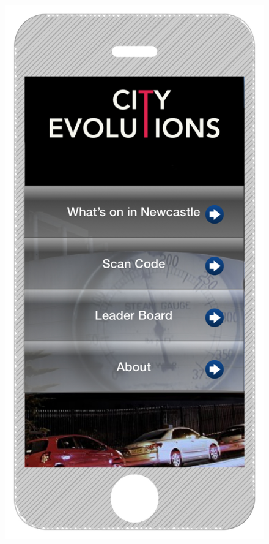 \documentclass[a4paper,12pt]{article}
\begin{document}
\begin{figure}
\centering
\begin{minipage}{.5\textwidth}
  \centering
  \includegraphics[width=.6\linewidth]{./images/iphone-interface}
  \label{iphone-interface-startscreen}
\end{minipage}%
\begin{minipage}{.5\textwidth}
  \centering

\end{minipage}
\end{figure}
\end{document}
